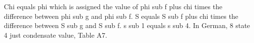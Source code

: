 Chi equals phi which is assigned the value of phi sub f plus chi times the difference between phi sub g and phi sub f. 
S equals S sub f plus chi times the difference between S sub g and S sub f. 
s sub 1 equals s sub 4. 
In German, 8 state 4 just condensate value, 
Table A7.